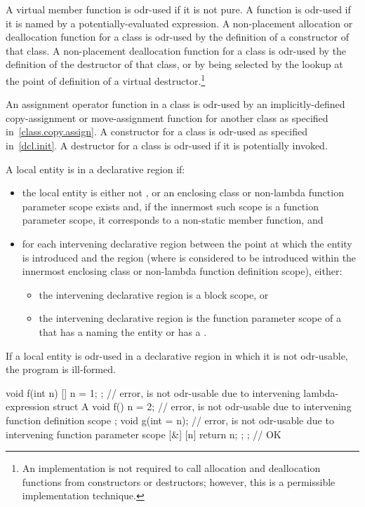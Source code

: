 \pnum
A virtual member
function is odr-used if it is not pure.
A function is odr-used if it is named by a potentially-evaluated expression.
A non-placement allocation or deallocation
function for a class is odr-used by the definition of a constructor of that
class. A non-placement deallocation function for a class is odr-used by the
definition of the destructor of that class, or by being selected by the
lookup at the point of definition of a virtual
destructor.\footnote{An implementation is not required
to call allocation and
deallocation functions from constructors or destructors; however, this
is a permissible implementation technique.}

\pnum
An assignment operator function in a class is odr-used by an
implicitly-defined
copy-assignment or move-assignment function for another class as specified
in~\ref{class.copy.assign}.
A constructor for a class is odr-used as specified
in~\ref{dcl.init}. A destructor for a class is odr-used if it is potentially
invoked.

\pnum
A local entity
is  in a declarative region if:

\begin{itemize}
\item the local entity is either
not , or
an enclosing class or non-lambda function parameter scope exists and,
if the innermost such scope is a function parameter scope,
it corresponds to a non-static member function, and
\item
for each intervening declarative region
between the point at which the entity is introduced and the region
(where  is considered to be introduced
within the innermost enclosing class or non-lambda function definition scope),
either:
\begin{itemize}
\item the intervening declarative region is a block scope, or
\item the intervening declarative region is the function parameter scope of a 
that has a  naming the entity or has a .
\end{itemize}
\end{itemize}

If a local entity is odr-used
in a declarative region in which it is not odr-usable,
the program is ill-formed.
\begin{example}
\begin{codeblock}
void f(int n) {
  [] { n = 1; };                // error,  is not odr-usable due to intervening lambda-expression
  struct A {
    void f() { n = 2; }         // error,  is not odr-usable due to intervening function definition scope
  };
  void g(int = n);              // error,  is not odr-usable due to intervening function parameter scope
  [&] { [n]{ return n; }; };    // OK
}
\end{codeblock}
\end{example}

